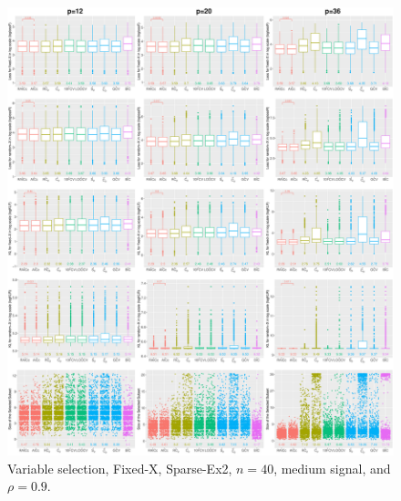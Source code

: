 \begin{figure}[!ht]
\centering
\includegraphics[width=\textwidth]{figures/supplement/fixedx/subset_selection/Sparse-Ex2_n40_msnr_rho09.eps}
\caption{Variable selection, Fixed-X, Sparse-Ex2, $n=40$, medium signal, and $\rho=0.9$.}
\end{figure}
\clearpage
